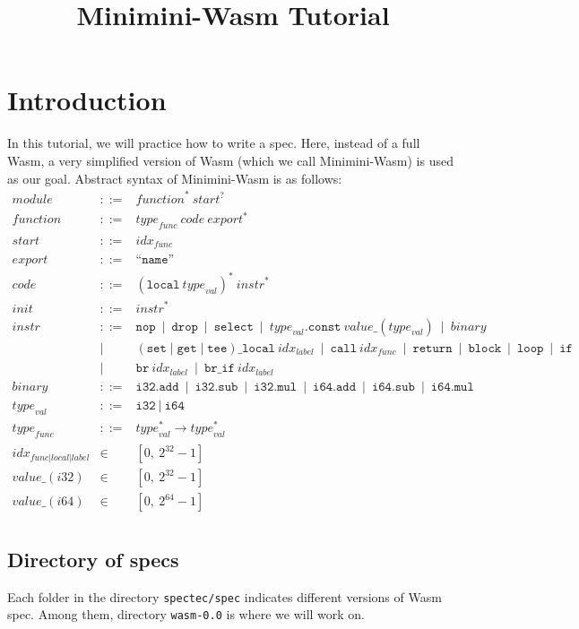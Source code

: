 \documentclass{article}
\date{}
\newcommand\X[1]{\mathit{#1}}
\newcommand\K[1]{\texttt{#1}}
\begin{document}
\title{Minimini-Wasm Tutorial}
\maketitle

\section{Introduction}
In this tutorial, we will practice how to write a spec.
Here, instead of a full Wasm, a very simplified version of Wasm (which we call Minimini-Wasm) is used as our goal.
Abstract syntax of Minimini-Wasm is as follows:
\[
\begin{array}{rrl}
\X{module} & ::= & \X{function}^*\ \X{start}^?\\
\X{function} & ::= & \X{type}_{\X{func}}\ \X{code}\ \X{export}^*\\
\X{start} & ::= & \X{idx}_{\X{func}}\\
\X{export} & ::= & \mbox{``}\K{name}\mbox{''}\\
\X{code} & ::= & (\K{local}\ \X{type}_{\X{val}})^*\ \X{instr}^*\\
\X{init} & ::= & \X{instr}^*\\
\X{instr} & ::= & \K{nop}~\mid~\K{drop}~\mid~\K{select}~\mid~
\X{type}_{\X{val}}\K{.const}\ \X{value}\K{\_}(\X{type}_{\X{val}})~\mid~
\X{binary}\\
&\mid&(\K{set}\mid\K{get}\mid\K{tee})\K{\_}\K{local}\ \X{idx}_{\X{label}}~\mid~
\K{call}\ \X{idx}_{\X{func}}~\mid~\K{return}~\mid~\K{block}~\mid~\K{loop}~\mid~\K{if}\\
&\mid&\K{br}\ \X{idx}_{\X{label}}~\mid~\K{br\_if}\ \X{idx}_{\X{label}}\\
\X{binary} & ::= & \K{i32.add}~\mid~\K{i32.sub}~\mid~\K{i32.mul}~\mid~
\K{i64.add}~\mid~\K{i64.sub}~\mid~\K{i64.mul}\\
\X{type}_{\X{val}} & ::= & \K{i32}~\mid~\K{i64}\\
\X{type}_{\X{func}} & ::= & \X{type}_{\X{val}}^*\rightarrow \X{type}_{\X{val}}^*\\
\X{idx}_{\X{func}|\X{local}|\X{label}} & \in & [0,\ 2^{32} - 1]\\
\X{value}\K{\_}(\X{i32}) & \in & [0,\ 2^{32} - 1]\\
\X{value}\K{\_}(\X{i64}) & \in & [0,\ 2^{64} - 1]\\
\end{array}
\]

\subsection{Directory of specs}
Each folder in the directory \K{spectec/spec} indicates different versions of Wasm spec.
Among them, directory \K{wasm-0.0} is where we will work on.
\end{document}
